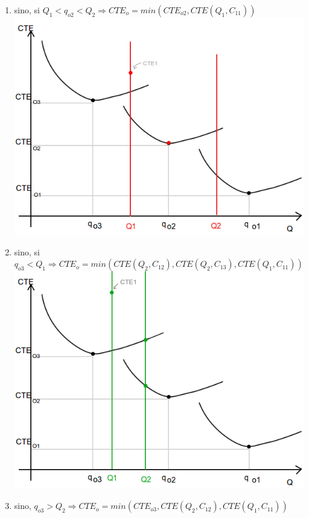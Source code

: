 \documentclass[a4paper,10pt]{article}
\begin{document}
\begin{enumerate}
 \item sino, si $ Q_1 < q_{o2} < Q_2 \Rightarrow CTE_o = min( CTE_{o2}, CTE(Q_1, C_{11})) $ \\
      \includegraphics[scale=0.4,keepaspectratio=true]{img/7/7_QvsCTE_3.png} 
 \item sino, si $q_{o3} < Q_1 \Rightarrow CTE_o = min( CTE(Q_2, C_{12}), CTE(Q_2, C_{13}), CTE(Q_1, C_{11})) $ \\
      \includegraphics[scale=0.4,keepaspectratio=true]{img/7/7_QvsCTE_4.png} 
 \item sino, $q_{o3} > Q_2 \Rightarrow CTE_o = min(CTE_{o3},CTE(Q_2, C_{12}), CTE(Q_1, C_{11}) ) $ \\

\end{enumerate}
\end{document}
